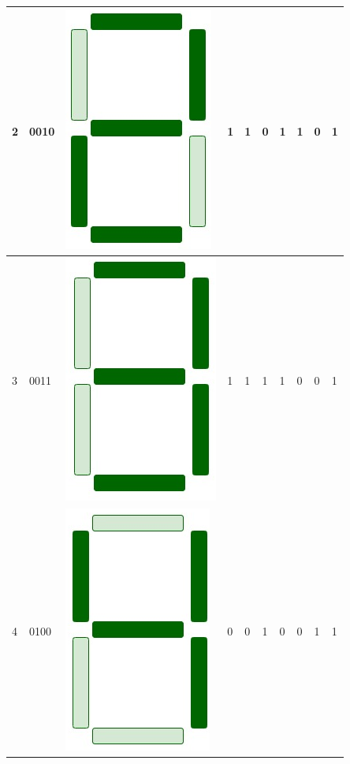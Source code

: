 \documentclass[12pt,singleside,a4paper]{article}
\begin{document}
\begin{center}
\begin{tabular}{ |p{1cm}|p{1cm}|p{1.5cm}|p{1cm}|p{1cm}|p{1cm}|p{1cm}|p{1cm}|p{1cm}|p{1cm}|}
    2   &   0010    &     \includegraphics[scale=0.1]{Display/2.png}       &   1   &   1   &   0   &   1   &   1   &   0   &   1   \\\hline
    3   &   0011    &      \includegraphics[scale=0.1]{Display/3.png}      &   1   &   1   &   1   &   1   &   0   &   0   &   1   \\\hline
    4   &   0100    &     \includegraphics[scale=0.1]{Display/4.png}       &   0   &   0   &   1   &   0   &   0   &   1   &   1   \\\hline

\end{tabular}
\end{center}
\end{document}
